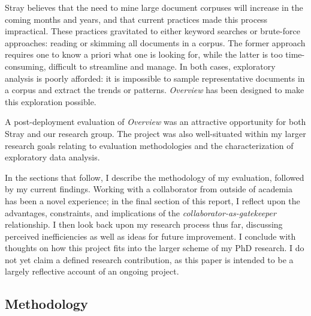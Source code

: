 Stray believes that the need to mine large document corpuses will increase in the coming months and years, and that current practices made this process impractical. 
These practices gravitated to either keyword searches or brute-force approaches: reading or skimming all documents in a corpus. 
The former approach requires one to know a priori what one is looking for, while the latter is too time-consuming, difficult to streamline and manage. 
In both cases, exploratory analysis is poorly afforded: it is impossible to sample representative documents in a corpus and extract the trends or patterns. 
{\it Overview} has been designed to make this exploration possible.

A post-deployment evaluation of {\it Overview} was an attractive opportunity for both Stray and our research group. 
The project was also well-situated within my larger research goals relating to evaluation methodologies and the characterization of exploratory data analysis. 

In the sections that follow, I describe the methodology of my evaluation, followed by my current findings. 
Working with a collaborator from outside of academia has been a novel experience; in the final section of this report, I reflect upon the advantages, constraints, and implications of the {\it collaborator-as-gatekeeper} relationship. 
I then look back upon my research process thus far, discussing perceived inefficiencies as well as ideas for future improvement. 
I conclude with thoughts on how this project fits into the larger scheme of my PhD research.
I do not yet claim a defined research contribution, as this paper is intended to be a largely reflective account of an ongoing project.

\subsection{Methodology}
\label{app:overview:prelim-methodology}

